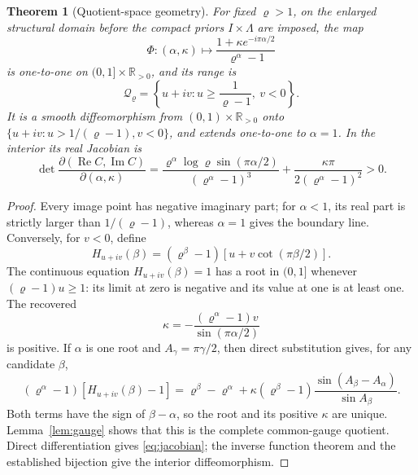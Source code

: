 \documentclass[11pt]{article}
\newtheorem{theorem}{Theorem}
\theoremstyle{definition}
\theoremstyle{remark}
\newcommand{\R}{\mathbb R}
\begin{document}
\begin{theorem}[Quotient-space geometry]
\label{thm:quotient}
For fixed \(\varrho>1\), on the enlarged structural domain before the compact
priors \(I\times\Lambda\) are imposed, the map
\[
 \Phi:(\alpha,\kappa)\longmapsto
 \frac{1+\kappa e^{-i\pi\alpha/2}}{\varrho^\alpha-1}
\]
is one-to-one on \((0,1]\times\R_{>0}\), and its range is
\[
 \mathcal Q_\varrho=
 \left\{u+iv:u\ge\frac{1}{\varrho-1},\ v<0\right\}.
\]
It is a smooth diffeomorphism from
\((0,1)\times\R_{>0}\) onto
\(\{u+iv:u>1/(\varrho-1),v<0\}\), and extends one-to-one to
\(\alpha=1\).  In the interior its real Jacobian is
\begin{equation}
 \det\frac{\partial(\operatorname{Re}C,\operatorname{Im}C)}
          {\partial(\alpha,\kappa)}
 =\frac{\varrho^\alpha\log\varrho\sin(\pi\alpha/2)}
        {(\varrho^\alpha-1)^3}
  +\frac{\kappa\pi}{2(\varrho^\alpha-1)^2}>0.
 \label{eq:jacobian}
\end{equation}
\end{theorem}
\begin{proof}
Every image point has negative imaginary part; for \(\alpha<1\), its real part is strictly larger than
\(1/(\varrho-1)\), whereas \(\alpha=1\) gives the boundary line.  Conversely,
for \(v<0\), define
\[
 H_{u+iv}(\beta)=(\varrho^\beta-1)
 [u+v\cot(\pi\beta/2)].
\]
The continuous equation \(H_{u+iv}(\beta)=1\) has a root in
\((0,1]\) whenever \((\varrho-1)u\ge1\): its limit at zero is negative and
its value at one is at least one.  The recovered
\[
 \kappa=-\frac{(\varrho^\alpha-1)v}{\sin(\pi\alpha/2)}
\]
is positive.  If \(\alpha\) is one root and \(A_\gamma=\pi\gamma/2\), then
direct substitution gives, for any candidate \(\beta\),
\[
 (\varrho^\alpha-1)[H_{u+iv}(\beta)-1]
 =\varrho^\beta-\varrho^\alpha
 +\kappa(\varrho^\beta-1)
 \frac{\sin(A_\beta-A_\alpha)}{\sin A_\beta}.
\]
Both terms have the sign of \(\beta-\alpha\), so the root and its positive
\(\kappa\) are unique.  Lemma~\ref{lem:gauge} shows that this is the complete
common-gauge quotient.
Direct differentiation gives \eqref{eq:jacobian}; the inverse function
theorem and the established bijection give the interior diffeomorphism.
\end{proof}
\end{document}
